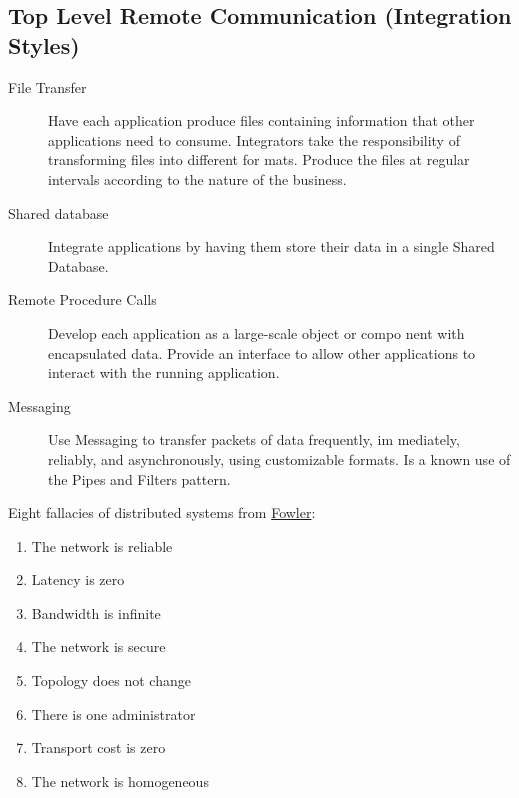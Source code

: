 \documentclass[../Main.tex]{subfiles}
\begin{document}
\subsection{Top Level Remote Communication (Integration Styles)}
\begin{multicols}{2}
    \begin{description}
        \item[File Transfer] Have each application produce files containing information
        that other applications need to consume. Integrators take
        the responsibility of transforming files into different for
       mats. Produce the files at regular intervals according to
        the nature of the business.
        \item[Shared database] Integrate applications by having them store their data in a
        single Shared Database.
        \item[Remote Procedure Calls]  Develop each application as a large-scale object or compo
        nent with encapsulated data. Provide an interface to allow
         other applications to interact with the running application.
        \item[Messaging] Use Messaging to transfer packets of data frequently, im
        mediately, reliably, and asynchronously, using customizable
         formats. Is a known use of the Pipes and Filters pattern.
    \end{description}
    \columnbreak

    Eight fallacies of distributed systems from \href{http://www.drdobbs.com/errant-architectures/184414966}{Fowler}:
    \begin{enumerate}
        \item The network is reliable
        \item Latency is zero
        \item Bandwidth is infinite
        \item The network is secure
        \item Topology does not change
        \item There is one administrator
        \item Transport cost is zero
        \item The network is homogeneous
    \end{enumerate}
\end{multicols}
\end{document}
